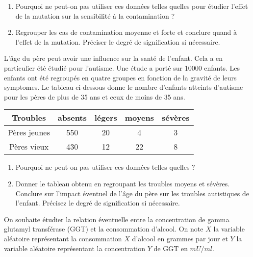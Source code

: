 \documentclass{article}
\numberwithin{equation}{section}
\begin{document}
\begin{enumerate}
\item Pourquoi ne peut-on pas utiliser ces données telles quelles pour étudier l'effet de la mutation sur la sensibilité à la contamination ?
\item  Regrouper les cas de contamination moyenne et forte et conclure quand à l'effet de la mutation. Préciser le degré de signification si nécessaire. 
\end{enumerate}

\bigskip



L'âge du père peut  avoir une influence sur la santé de l'enfant. Cela a en particulier été étudié pour l'autisme. Une étude a porté sur 10000 enfants.  Les enfants ont été regroupés en quatre groupes en fonction de la gravité de leurs symptomes. Le tableau ci-dessous donne le nombre d'enfants atteints d'autisme pour les pères de plus de 35 ans et ceux de moins de 35  ans.
\begin{center}
\begin{tabular}{|c|c|c|c|c|}
\hline
Troubles & absents & légers&moyens & sévères\\
\hline
Pères jeunes & 550 & 20 & 4 & 3\\
\hline
Pères vieux &430 & 12 & 22 & 8\\
\hline
\end{tabular}
\end{center}

\begin{enumerate}
\item Pourquoi ne peut-on pas utiliser ces données telles quelles ?
\item Donner le tableau obtenu en regroupant les troubles moyens et sévères. Conclure sur l'impact éventuel de l'âge du père sur les troubles autistiques de l'enfant. Précisez le degré de signification si nécessaire. 
\end{enumerate}







\iffalse %


On souhaite étudier la relation éventuelle entre la concentration de gamma glutamyl transférase (GGT) et la 
consommation d'alcool. 
On note $X$ la variable aléatoire représentant la consommation $X$ d'alcool en grammes par jour  et $Y$ 
la variable aléatoire représentant la concentration $Y$ de GGT en $mU/ml$.
\end{document}

